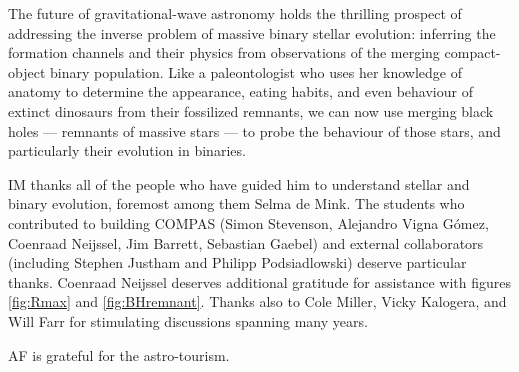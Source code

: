 \documentclass[iop,onecolumn]{revtex4}
\begin{document}
The future of gravitational-wave astronomy holds the thrilling prospect of addressing the inverse problem of massive binary stellar evolution: inferring the formation channels and their physics from observations of the merging compact-object binary population.  Like a paleontologist who uses her knowledge of anatomy to determine the appearance, eating habits, and even behaviour of extinct dinosaurs from their fossilized remnants, we can now use merging black holes --- remnants of massive stars --- to probe the behaviour of those stars, and particularly their evolution in binaries.


\begin{acknowledgements}
IM thanks all of the people who have guided him to understand stellar and binary evolution, foremost among them Selma de Mink.   The students who contributed to building COMPAS (Simon Stevenson, Alejandro Vigna G\'{o}mez, Coenraad Neijssel, Jim Barrett, Sebastian Gaebel) and external collaborators (including Stephen Justham and Philipp Podsiadlowski) deserve particular thanks.  Coenraad Neijssel deserves additional gratitude for assistance with figures \ref{fig:Rmax} and \ref{fig:BHremnant}. Thanks also to Cole Miller, Vicky Kalogera, and Will Farr for stimulating discussions spanning many years. 

AF is grateful for the astro-tourism.
\end{acknowledgements}



\end{document}
